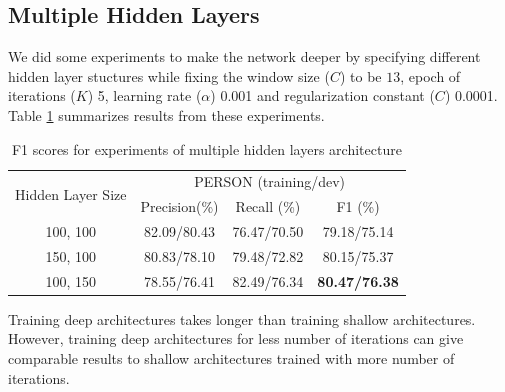 \documentclass[letterpaper]{article}
\begin{document}
\subsection{Multiple Hidden Layers}
We did some experiments to make the network deeper by specifying different hidden layer stuctures while fixing the window size ($C$) to be $13$, epoch of iterations ($K$) 5, learning rate ($\alpha$) 0.001 and regularization constant ($C$) 0.0001. Table \ref{tab:multihidden} summarizes results from these experiments.
\begin{table}[h]
\begin{center}
\begin{tabular}{|c|c|c|c|}
\hline
\multirow{2}{*}{Hidden Layer Size} & 
\multicolumn{3}{|c|}{PERSON (training/dev)}
\\
\hhline{~---}
& Precision(\%) & Recall (\%) & F1 (\%) \\
\hline
100, 100 & 82.09/80.43 & 76.47/70.50 & 79.18/75.14
\\ \hline
150, 100 & 80.83/78.10  & 79.48/72.82 & 80.15/75.37
\\ \hline
100, 150 & 78.55/76.41 & 82.49/76.34 & \textbf{80.47/76.38} \\
\hline
\end{tabular}
\caption{F1 scores for experiments of multiple hidden layers architecture}
\label{tab:multihidden}
\end{center}
\end{table}
Training deep architectures takes longer than training shallow architectures. However, training deep architectures for less number of iterations can give comparable results to shallow architectures trained with more number of iterations.
\end{document}
